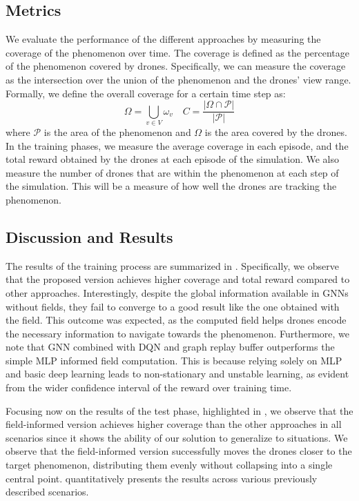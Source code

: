 \subsection{Metrics}
We evaluate the performance of the different approaches by measuring the coverage of the phenomenon over time.
%
The coverage is defined as the percentage of the phenomenon covered by drones.
%
Specifically, we can measure the coverage as the intersection over the union of the phenomenon and the drones' view range.
%
Formally, we define the overall coverage for a certain time step as:
\begin{equation*}
\Omega = \bigcup_{v \in V} \omega_v
\quad 
C = \frac{|\Omega \cap \mathcal{P}|}{|\mathcal{P}|}
\end{equation*}
where $\mathcal{P}$ is the area of the phenomenon and $\Omega$ is the area covered by the drones.
In the training phases, 
 we measure the average coverage in each episode, and the total reward obtained by the drones at each episode of the simulation. 
%
We also measure the number of drones that are within the phenomenon at each step of the simulation.
This will be a measure of how well the drones are tracking the phenomenon.

\subsection{Discussion and Results}
The results of the training process are summarized in .
% 
%
Specifically, we observe that the proposed version achieves higher coverage and total reward compared to other approaches. 
%
Interestingly, despite the global information available in \acp{GNN} without fields, they fail to converge to a good result like the one obtained with the field. 
%
This outcome was expected, as the computed field helps drones encode the necessary information to navigate towards the phenomenon.
%
Furthermore, we note that \ac{GNN} combined with \ac{DQN} and graph replay buffer outperforms the simple \ac{MLP} informed field computation. 
%
This is because relying solely on \ac{MLP} and basic deep learning leads to non-stationary and unstable learning, 
 as evident from the wider confidence interval of the reward over training time.

Focusing now on the results of the test phase, highlighted in  ,
 we observe that the field-informed version achieves higher coverage than the other approaches in all scenarios since it shows the ability of our solution to generalize to situations. 
% 
We observe that the field-informed version successfully moves the drones closer to the target phenomenon, 
 distributing them evenly without collapsing into a single central point. 
  quantitatively presents the results across various previously described scenarios.

